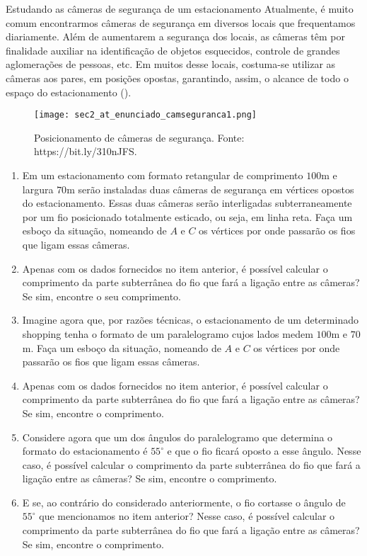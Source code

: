 \begin{task}{Estudando as câmeras de segurança de um estacionamento}
Atualmente, é muito comum encontrarmos câmeras de segurança em diversos locais que frequentamos diariamente. 
%
Além de aumentarem a segurança dos locais, as câmeras têm por finalidade auxiliar na identificação de objetos esquecidos, controle de grandes aglomerações de pessoas, etc. Em muitos desse locais, costuma-se utilizar as câmeras aos pares,  em posições opostas, garantindo, assim, o alcance de todo o espaço do estacionamento (). 
 
\begin{figure}[H]
    \centering
    \texttt{[image: sec2\_at\_enunciado\_camseguranca1.png]}
    \caption{Posicionamento de câmeras de segurança. Fonte: https://bit.ly/310nJFS.}
    \label{sec2_at_fig_camseguranca1}
\end{figure}

\begin{enumerate}
    \item{}
    Em um estacionamento com formato retangular de comprimento $100$m e largura $70$m serão instaladas duas câmeras de segurança em vértices opostos do estacionamento. Essas duas câmeras serão interligadas subterraneamente por um fio posicionado totalmente esticado, ou seja, em linha reta. Faça um esboço da situação, nomeando de $A$ e $C$ os vértices por onde passarão os fios que ligam essas câmeras.

    \item{}
    Apenas com os dados fornecidos no item anterior, é possível calcular o comprimento da parte subterrânea do fio que fará a ligação entre as câmeras? Se sim, encontre o seu comprimento.

    \item{}
    Imagine agora que, por razões técnicas, o estacionamento de um determinado shopping tenha o formato de um paralelogramo cujos lados medem $100$m e $70$m. Faça um esboço da situação, nomeando de $A$ e $C$ os vértices por onde passarão os fios que ligam essas câmeras.

    \item{}
    Apenas com os dados fornecidos no item anterior, é possível calcular o comprimento da parte subterrânea do fio que fará a ligação entre as câmeras? Se sim, encontre o comprimento.

    \item{}
    Considere agora que um dos ângulos do paralelogramo que determina o formato do estacionamento é $55^\circ$ e que o fio ficará oposto a esse ângulo. Nesse caso, é possível calcular o comprimento da parte subterrânea do fio que fará a ligação entre as câmeras? Se sim, encontre o comprimento.
    
    \item{}
    E se, ao contrário do considerado anteriormente, o fio cortasse o ângulo de $55^\circ$ que mencionamos no item anterior? Nesse caso, é possível calcular o comprimento da parte subterrânea do fio que fará a ligação entre as câmeras? Se sim, encontre o comprimento.
\end{enumerate}
\end{task}

